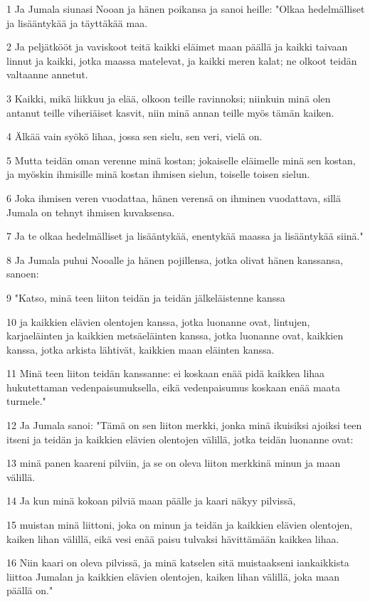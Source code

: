 \par 1 Ja Jumala siunasi Nooan ja hänen poikansa ja sanoi heille: "Olkaa hedelmälliset ja lisääntykää ja täyttäkää maa.
\par 2 Ja peljätkööt ja vaviskoot teitä kaikki eläimet maan päällä ja kaikki taivaan linnut ja kaikki, jotka maassa matelevat, ja kaikki meren kalat; ne olkoot teidän valtaanne annetut.
\par 3 Kaikki, mikä liikkuu ja elää, olkoon teille ravinnoksi; niinkuin minä olen antanut teille viheriäiset kasvit, niin minä annan teille myös tämän kaiken.
\par 4 Älkää vain syökö lihaa, jossa sen sielu, sen veri, vielä on.
\par 5 Mutta teidän oman verenne minä kostan; jokaiselle eläimelle minä sen kostan, ja myöskin ihmisille minä kostan ihmisen sielun, toiselle toisen sielun.
\par 6 Joka ihmisen veren vuodattaa, hänen verensä on ihminen vuodattava, sillä Jumala on tehnyt ihmisen kuvaksensa.
\par 7 Ja te olkaa hedelmälliset ja lisääntykää, enentykää maassa ja lisääntykää siinä."
\par 8 Ja Jumala puhui Nooalle ja hänen pojillensa, jotka olivat hänen kanssansa, sanoen:
\par 9 "Katso, minä teen liiton teidän ja teidän jälkeläistenne kanssa
\par 10 ja kaikkien elävien olentojen kanssa, jotka luonanne ovat, lintujen, karjaeläinten ja kaikkien metsäeläinten kanssa, jotka luonanne ovat, kaikkien kanssa, jotka arkista lähtivät, kaikkien maan eläinten kanssa.
\par 11 Minä teen liiton teidän kanssanne: ei koskaan enää pidä kaikkea lihaa hukutettaman vedenpaisumuksella, eikä vedenpaisumus koskaan enää maata turmele."
\par 12 Ja Jumala sanoi: "Tämä on sen liiton merkki, jonka minä ikuisiksi ajoiksi teen itseni ja teidän ja kaikkien elävien olentojen välillä, jotka teidän luonanne ovat:
\par 13 minä panen kaareni pilviin, ja se on oleva liiton merkkinä minun ja maan välillä.
\par 14 Ja kun minä kokoan pilviä maan päälle ja kaari näkyy pilvissä,
\par 15 muistan minä liittoni, joka on minun ja teidän ja kaikkien elävien olentojen, kaiken lihan välillä, eikä vesi enää paisu tulvaksi hävittämään kaikkea lihaa.
\par 16 Niin kaari on oleva pilvissä, ja minä katselen sitä muistaakseni iankaikkista liittoa Jumalan ja kaikkien elävien olentojen, kaiken lihan välillä, joka maan päällä on."

